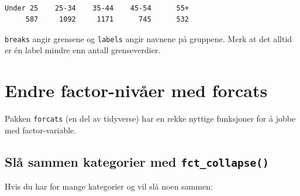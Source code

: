 \documentclass[
  norsk,
  letterpaper,
  DIV=11,
  numbers=noendperiod]{scrreprt}
\newenvironment{Shaded}{\begin{snugshade}}{\end{snugshade}}
\newcommand{\AttributeTok}[1]{\textcolor[rgb]{0.40,0.45,0.13}{#1}}
\newcommand{\DecValTok}[1]{\textcolor[rgb]{0.68,0.00,0.00}{#1}}
\newcommand{\FunctionTok}[1]{\textcolor[rgb]{0.28,0.35,0.67}{#1}}
\newcommand{\NormalTok}[1]{\textcolor[rgb]{0.00,0.23,0.31}{#1}}
\newcommand{\OtherTok}[1]{\textcolor[rgb]{0.00,0.23,0.31}{#1}}
\newcommand{\SpecialCharTok}[1]{\textcolor[rgb]{0.37,0.37,0.37}{#1}}
\newcommand{\StringTok}[1]{\textcolor[rgb]{0.13,0.47,0.30}{#1}}
\theoremstyle{definition}
\theoremstyle{remark}
\begin{document}
\begin{Shaded}
\end{Shaded}

\begin{verbatim}

Under 25    25-34    35-44    45-54      55+ 
     587     1092     1171      745      532 
\end{verbatim}

\texttt{breaks} angir grensene og \texttt{labels} angir navnene på
gruppene. Merk at det alltid er én label mindre enn antall
grenseverdier.

\section{Endre factor-nivåer med
forcats}\label{endre-factor-nivuxe5er-med-forcats}

Pakken \texttt{forcats} (en del av tidyverse) har en rekke nyttige
funksjoner for å jobbe med factor-variable.

\subsection{\texorpdfstring{Slå sammen kategorier med
\texttt{fct\_collapse()}}{Slå sammen kategorier med fct\_collapse()}}\label{sluxe5-sammen-kategorier-med-fct_collapse}

Hvis du har for mange kategorier og vil slå noen sammen:
\end{document}
